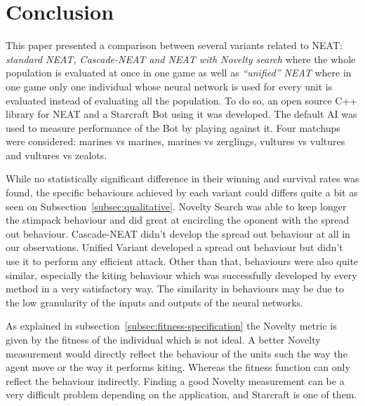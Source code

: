 \section{Conclusion}\label{section:conclusion}

This paper presented a comparison between several variants related to
NEAT: \emph{standard NEAT, Cascade-NEAT and NEAT with Novelty search}
where the whole population is evaluated at once in one game as well as
\emph{``unified'' NEAT} where in one game only one individual whose
neural network is used for every unit is evaluated instead of
evaluating all the population.  To do so, an open source C++ library
for NEAT and a Starcraft Bot using it was developed.  The default AI
was used to measure performance of the Bot by playing against it.
Four matchups were considered: marines vs marines, marines vs
zerglings, vultures vs vultures and vultures vs zealots.

While no statistically significant difference in their winning and
survival rates was found, the specific behaviours achieved by each
variant could differs quite a bit as seen on
Subsection~\ref{subsec:qualitative}. Novelty Search was able to keep
longer the stimpack behaviour and did great at encircling the oponent
with the spread out behaviour.  Cascade-NEAT didn't develop the spread
out behaviour at all in our observations.  Unified Variant developed a
spread out behaviour but didn't use it to perform any efficient
attack.  Other than that, behaviours were also quite similar,
especially the kiting behaviour which was successfully developed by
every method in a very satisfactory way. The similarity in behaviours
may be due to the low granularity of the inputs and outputs of the
neural networks.

As explained in subsection~\ref{subsec:fitness-specification} the
Novelty metric is given by the fitness of the individual which is not
ideal. A better Novelty measurement would directly reflect the
behaviour of the units such the way the agent move or the way it
performs kiting. Whereas the fitness function can only reflect the
behaviour indirectly. Finding a good Novelty measurement can be a very
difficult problem depending on the application, and Starcraft is one
of them.

